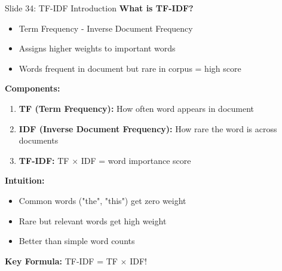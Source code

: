 \documentclass[8pt]{beamer}
\begin{document}
	\begin{frame}{Slide 34: TF-IDF Introduction}
		\fontsize{6.5}{7.5}\selectfont
		\textbf{What is TF-IDF?}
		\begin{itemize}
			\item Term Frequency - Inverse Document Frequency
			\item Assigns higher weights to important words
			\item Words frequent in document but rare in corpus = high score
		\end{itemize}
		
		\vspace{0.1cm}
		\textbf{Components:}
		\begin{enumerate}
			\item \textbf{TF (Term Frequency):} How often word appears in document
			\item \textbf{IDF (Inverse Document Frequency):} How rare the word is across documents
			\item \textbf{TF-IDF:} TF $\times$ IDF = word importance score
		\end{enumerate}
		
		\vspace{0.1cm}
		\textbf{Intuition:}
		\begin{itemize}
			\item Common words ("the", "this") get zero weight
			\item Rare but relevant words get high weight
			\item Better than simple word counts
		\end{itemize}
		
		\textcolor{myblue}{\textbf{Key Formula:}} TF-IDF = TF $\times$ IDF!
	\end{frame}
	
\end{document}
